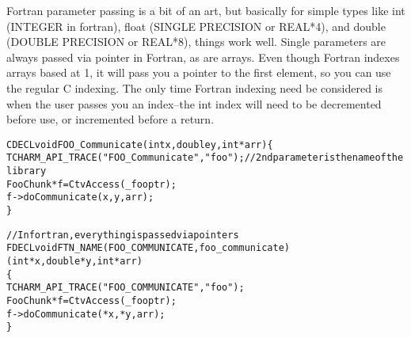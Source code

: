 \documentclass[10pt]{article}
\begin{document}
\begin{enumerate}
Fortran parameter passing is a bit of an art, but basically for simple 
types like int (INTEGER in fortran), float (SINGLE PRECISION or REAL*4),
and double (DOUBLE PRECISION or REAL*8), things work well.  Single parameters
are always passed via pointer in Fortran, as are arrays.  Even though 
Fortran indexes arrays based at 1, it will pass you a pointer to the 
first element, so you can use the regular C indexing.  The only time Fortran
indexing need be considered is when the user passes you an index--the
int index will need to be decremented before use, or incremented before
a return.

\begin{alltt}
CDECL void FOO\_Communicate(int x, double y, int * arr) \{
   TCHARM\_API\_TRACE("FOO\_Communicate", "foo"); //2nd parameter is the name of the library
   FooChunk *f = CtvAccess(\_fooptr);
   f->doCommunicate(x, y, arr);
\}

//In fortran, everything is passed via pointers
FDECL void FTN\_NAME(FOO_COMMUNICATE, foo_communicate)
     (int *x, double *y, int *arr)
\{
   TCHARM\_API\_TRACE("FOO_COMMUNICATE", "foo");
   FooChunk *f = CtvAccess(\_fooptr);
   f->doCommunicate(*x, *y, arr); 
\}
\end{alltt}

\end{enumerate}


\end{document}
